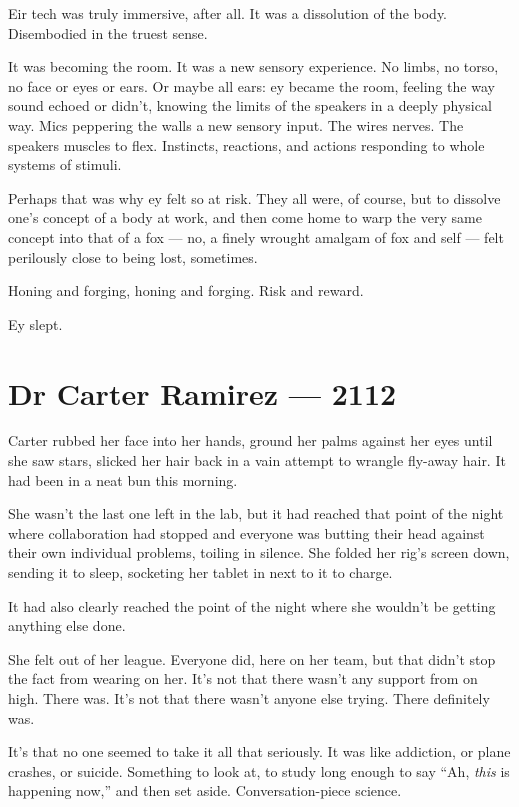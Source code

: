 Eir tech was truly immersive, after all. It was a dissolution of the body. Disembodied in the truest sense.

It was becoming the room. It was a new sensory experience. No limbs, no torso, no face or eyes or ears. Or maybe all ears: ey became the room, feeling the way sound echoed or didn't, knowing the limits of the speakers in a deeply physical way. Mics peppering the walls a new sensory input. The wires nerves. The speakers muscles to flex. Instincts, reactions, and actions responding to whole systems of stimuli.

Perhaps that was why ey felt so at risk. They all were, of course, but to dissolve one's concept of a body at work, and then come home to warp the very same concept into that of a fox --- no, a finely wrought amalgam of fox and self --- felt perilously close to being lost, sometimes.

Honing and forging, honing and forging. Risk and reward.

Ey slept.

\chapter*{Dr Carter Ramirez — 2112}

Carter rubbed her face into her hands, ground her palms against her eyes until she saw stars, slicked her hair back in a vain attempt to wrangle fly-away hair. It had been in a neat bun this morning.

She wasn't the last one left in the lab, but it had reached that point of the night where collaboration had stopped and everyone was butting their head against their own individual problems, toiling in silence. She folded her rig's screen down, sending it to sleep, socketing her tablet in next to it to charge.

It had also clearly reached the point of the night where she wouldn't be getting anything else done.

She felt out of her league. Everyone did, here on her team, but that didn't stop the fact from wearing on her. It's not that there wasn't any support from on high. There was. It's not that there wasn't anyone else trying. There definitely was.

It's that no one seemed to take it all that seriously. It was like addiction, or plane crashes, or suicide. Something to look at, to study long enough to say ``Ah, \emph{this} is happening now,'' and then set aside. Conversation-piece science.

